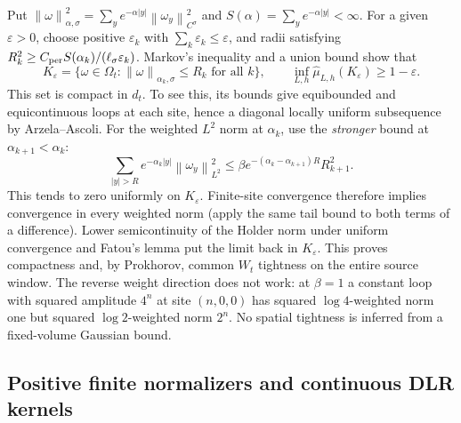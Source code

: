 \documentclass[11pt]{article}
\numberwithin{equation}{section}
\theoremstyle{definition}
\newcommand{\norm}[1]{\left\lVert#1\right\rVert}
\begin{document}
Put $\norm{\omega}_{\alpha,\sigma}^2
=\sum_y e^{-\alpha|y|}\norm{\omega_y}_{C^\sigma}^2$ and
$S(\alpha)=\sum_y e^{-\alpha|y|}<\infty$.
For a given $\varepsilon>0$, choose positive $\varepsilon_k$ with
$\sum_k\varepsilon_k\leq\varepsilon$, and radii satisfying
$R_k^2\geq C_{\rm per}S(\alpha_k)/(\ell_\sigma\varepsilon_k)$.
Markov's inequality and a union bound show that
\begin{equation}
 K_\varepsilon=\{\omega\in\Omega_t:
                  \norm{\omega}_{\alpha_k,\sigma}\leq R_k\text{ for all }k\},
 \qquad
 \inf_{L,h}\widehat\mu_{L,h}(K_\varepsilon)\geq1-\varepsilon.
 \label{eq:dlr-compact-set}
\end{equation}
This set is compact in $d_t$.  To see this, its bounds give equibounded and
equicontinuous loops at each site, hence a diagonal locally uniform subsequence
by Arzela--Ascoli.  For the weighted $L^2$ norm at $\alpha_k$, use the
\emph{stronger} bound at $\alpha_{k+1}<\alpha_k$:
\begin{equation}
 \sum_{|y|>R}e^{-\alpha_k|y|}\norm{\omega_y}_{L^2}^2
 \leq\beta e^{-(\alpha_k-\alpha_{k+1})R}R_{k+1}^2.
 \label{eq:weighted-tail-direction}
\end{equation}
This tends to zero uniformly on $K_\varepsilon$.  Finite-site convergence
therefore implies convergence in every weighted norm (apply the same tail
bound to both terms of a difference).  Lower semicontinuity of the Holder
norm under uniform convergence and Fatou's lemma put the limit back in
$K_\varepsilon$.  This proves compactness and, by Prokhorov, common
$W_t$ tightness on the entire source window.  The reverse weight direction
does not work: at $\beta=1$ a constant loop with squared amplitude $4^n$
at site $(n,0,0)$ has squared $\log4$-weighted norm one but squared
$\log2$-weighted norm $2^n$.  No spatial tightness is inferred from a
fixed-volume Gaussian bound.

\subsection{Positive finite normalizers and continuous DLR kernels}
\label{sec:dlr-kernel-continuity}
\end{document}
